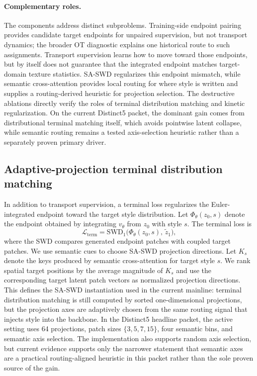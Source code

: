 \documentclass[letterpaper]{article}
\begin{document}
\paragraph{Complementary roles.}
The components address distinct subproblems. Training-side endpoint pairing provides candidate target endpoints for unpaired supervision, but not transport dynamics; the broader OT diagnostic explains one historical route to such assignments. Transport supervision learns how to move toward those endpoints, but by itself does not guarantee that the integrated endpoint matches target-domain texture statistics. SA-SWD regularizes this endpoint mismatch, while semantic cross-attention provides local routing for where style is written and supplies a routing-derived heuristic for projection selection. The destructive ablations directly verify the roles of terminal distribution matching and kinetic regularization. On the current Distinct5 packet, the dominant gain comes from distributional terminal matching itself, which avoids pointwise latent collapse, while semantic routing remains a tested axis-selection heuristic rather than a separately proven primary driver.

\subsection{Adaptive-projection terminal distribution matching}
In addition to transport supervision, a terminal loss regularizes the Euler-integrated endpoint toward the target style distribution. Let $\Phi_\theta(z_0,s)$ denote the endpoint obtained by integrating $v_\theta$ from $z_0$ with style $s$. The terminal loss is
\begin{equation}
    \mathcal{L}_{\mathrm{term}} = \mathrm{SWD}_1\bigl(\Phi_\theta(z_0,s),\,\tilde{z}_1\bigr),
\end{equation}
where the SWD compares generated endpoint patches with coupled target patches. We use semantic cues to choose SA-SWD projection directions. Let $K_s$ denote the keys produced by semantic cross-attention for target style $s$. We rank spatial target positions by the average magnitude of $K_s$ and use the corresponding target latent patch vectors as normalized projection directions. This defines the SA-SWD instantiation used in the current mainline: terminal distribution matching is still computed by sorted one-dimensional projections, but the projection axes are adaptively chosen from the same routing signal that injects style into the backbone. In the Distinct5 headline packet, the active setting uses 64 projections, patch sizes $\{3,5,7,15\}$, four semantic bins, and semantic axis selection. The implementation also supports random axis selection, but current evidence supports only the narrower statement that semantic axes are a practical routing-aligned heuristic in this packet rather than the sole proven source of the gain.
\end{document}
